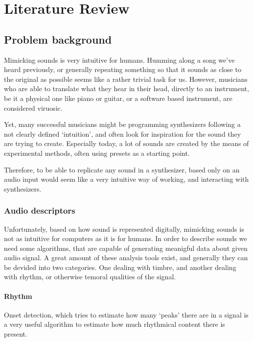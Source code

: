 \chapter{Literature Review}

\section{Problem background}

Mimicking sounds is very intuitive for humans. Humming along a song
we've heard previously, or generally repeating something so that it
sounds as close to the original as possible seems like a rather
trivial task for us. However, musicians who are able to translate what
they hear in their head, directly to an instrument, be it a physical
one like piano or guitar, or a software based instrument, are
considered viruosic.

Yet, many successful musicians might be programming synthesizers
following a not clearly defined `intuition', and often look for
inspiration for the sound they are trying to create.
Especially today, a lot of sounds are created by the means of experimental
methods, often using presets as a starting point.

Therefore, to be able to replicate any sound in a synthesizer, based
only on an audio input would seem like a very intuitive way of
working, and interacting with synthesizers.

\subsection{Audio descriptors}

Unfortunately, based on how sound is represented digitally, mimicking
sounds is not as intuitive for computers as it is for humans. In order
to describe sounds we need some algorithms, that are capable of
generating meanigful data about given audio signal. A great amount of
these analysis tools exist, and generally they can be devided into two
categories. One dealing with timbre, and another dealing with rhythm,
or otherwise temoral qualities of the signal.

\subsubsection{Rhythm}

Onset detection, which tries to estimate how many `peaks' there are
in a signal is a very useful algorithm to estimate how much rhythmical
content there is present.

